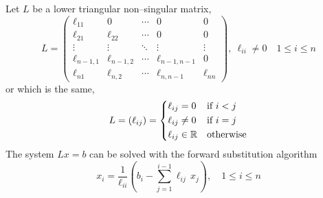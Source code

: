 Let $L$ be a lower triangular non--singular matrix,
\begin{equation*}
	L = 
	\begin{pmatrix}
		\ell_{11} 		& 0 			& \cdots & 0 				& 0  \\
		\ell_{21} 		& \ell_{22} 	& \cdots & 0 				& 0 \\
		\vdots 			& \vdots 		& \ddots & \vdots 	  		& \vdots \\
		\ell_{n-1,1} 	& \ell_{n-1,2} 	& \cdots & \ell_{n-1,n-1} 	& 0 \\
		\ell_{n1} 		& \ell_{n,2} 	& \cdots & \ell_{n,n-1} 	& \ell_{nn}
	\end{pmatrix},
	\
	\ell_{ii} \neq 0 \quad 1 \leq i \leq n
\end{equation*}
or which is the same,
\begin{equation*}
	L = (\ell_{ij}) = 
	\left\{
	\begin{aligned}
		&\ell_{ij} = 0 			& 	&\text{if } i < j \\
		&\ell_{ij} \neq 0 		& 	&\text{if } i = j \\
		&\ell_{ij} \in \mathbb{R} 	& 	&\text{otherwise} 
	\end{aligned}
	\right.
\end{equation*}
The system $L x = b$ can be solved with the forward substitution algorithm
\begin{equation*}
	x_i = 
	\frac{1}{\ell_{ii}} 
	\left(
	b_i - \sum_{j=1}^{i-1} \ell_{ij} \, x_j
	\right),
	\quad
	1 \leq i \leq n
\end{equation*}

